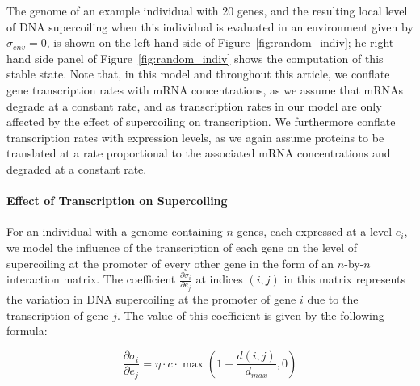 The genome of an example individual with 20 genes, and the resulting local level of DNA supercoiling when this individual is evaluated in an environment given by $\sigma_{env} = 0$, is shown on the left-hand side of Figure~\ref{fig:random_indiv};
he right-hand side panel of Figure~\ref{fig:random_indiv} shows the computation of this stable state.
Note that, in this model and throughout this article, we conflate
gene transcription rates with mRNA concentrations, as we assume that mRNAs degrade at a constant rate, and as transcription rates in our model are only affected by the effect of supercoiling on transcription.
We furthermore conflate transcription rates with expression levels, as we again assume proteins to be translated at a rate proportional to the associated mRNA concentrations and degraded at a constant rate.

\paragraph{Effect of Transcription on Supercoiling}
For an individual with a genome containing $n$ genes, each expressed at a level $e_i$, we model the influence of the transcription of each gene on the level of supercoiling at the promoter of every other gene in the form of an $n$-by-$n$ interaction matrix.
The coefficient $\frac{\partial\sigma_i}{\partial e_j}$ at indices $(i, j)$ in this matrix represents the variation in DNA supercoiling at the promoter of gene $i$ due to the transcription of gene $j$.
The value of this coefficient is given by the following formula:

\begin{equation}
  \frac{\partial\sigma_{i}}{\partial e_j} = \eta \cdot c \cdot \max(1-\frac{d(i, j)}{d_{max}}, 0)
  \label{eq:dsigmade}
\end{equation}

